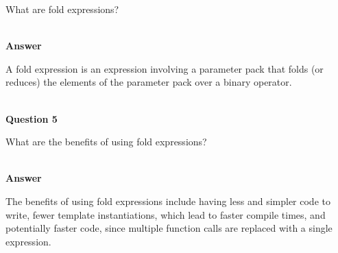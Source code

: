 What are fold expressions?

\hspace*{\fill} \\ %
\noindent
\textbf{Answer}

A fold expression is an expression involving a parameter pack that folds (or reduces) the elements of the parameter pack over a binary operator.

\hspace*{\fill} \\ %
\noindent
\textbf{Question 5}

What are the benefits of using fold expressions?

\hspace*{\fill} \\ %
\noindent
\textbf{Answer}

The benefits of using fold expressions include having less and simpler code to write, fewer template instantiations, which lead to faster compile times, and potentially faster code, since multiple function calls are replaced with a single expression.












